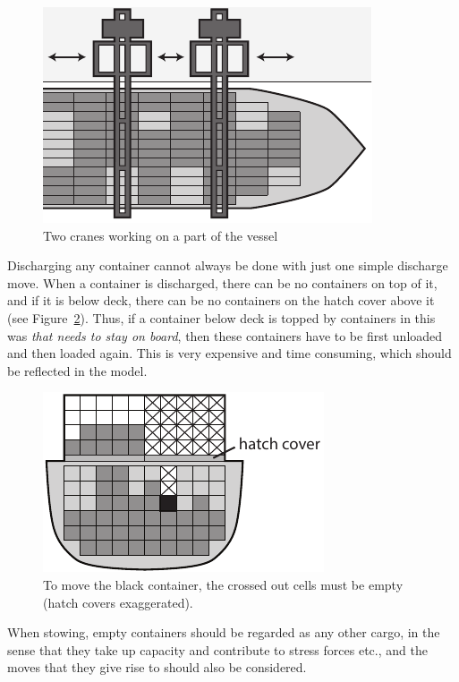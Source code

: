\begin{figure}
	\centering
		\includegraphics[scale=0.8]{figures/cranes.pdf}
	\caption{Two cranes working on a part of the vessel}
	\label{fig:cranes}
\end{figure}

Discharging any container cannot always be done with just one simple discharge move. When a container is discharged, there can be no containers on top of it, and if it is below deck, there can be no containers on the hatch cover above it (see Figure~\ref{fig:overstowA}). Thus, if a container below deck is topped by containers in this was \emph{that needs to stay on board}, then these containers have to be first unloaded and then loaded again. This is very expensive and time consuming, which should be reflected in the model. 

\begin{figure}
	\centering
		\includegraphics[scale=0.9]{figures/overstow.pdf}
	\caption{To move the black container, the crossed out cells must be empty (hatch covers exaggerated).}
	\label{fig:overstowA}
\end{figure}

When stowing, empty containers should be regarded as any other cargo, in the sense that they take up capacity and contribute to stress forces etc., and the moves that they give rise to should also be considered.    